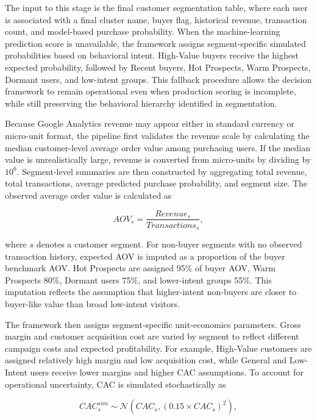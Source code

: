 \documentclass[conference]{IEEEtran}
\begin{document}
The input to this stage is the final customer segmentation table, where each user is associated with a final cluster name, buyer flag, historical revenue, transaction count, and model-based purchase probability. When the machine-learning prediction score is unavailable, the framework assigns segment-specific simulated probabilities based on behavioral intent. High-Value buyers receive the highest expected probability, followed by Recent buyers, Hot Prospects, Warm Prospects, Dormant users, and low-intent groups. This fallback procedure allows the decision framework to remain operational even when production scoring is incomplete, while still preserving the behavioral hierarchy identified in segmentation.

Because Google Analytics revenue may appear either in standard currency or micro-unit format, the pipeline first validates the revenue scale by calculating the median customer-level average order value among purchasing users. If the median value is unrealistically large, revenue is converted from micro-units by dividing by $10^{6}$. Segment-level summaries are then constructed by aggregating total revenue, total transactions, average predicted purchase probability, and segment size. The observed average order value is calculated as

\begin{equation}
AOV_s = \frac{\textit{Revenue}_s}{\textit{Transactions}_s},
\end{equation}

where $s$ denotes a customer segment. For non-buyer segments with no observed transaction history, expected AOV is imputed as a proportion of the buyer benchmark AOV. Hot Prospects are assigned 95\% of buyer AOV, Warm Prospects 80\%, Dormant users 75\%, and lower-intent groups 55\%. This imputation reflects the assumption that higher-intent non-buyers are closer to buyer-like value than broad low-intent visitors.

The framework then assigns segment-specific unit-economics parameters. Gross margin and customer acquisition cost are varied by segment to reflect different campaign costs and expected profitability. For example, High-Value customers are assigned relatively high margin and low acquisition cost, while General and Low-Intent users receive lower margins and higher CAC assumptions. To account for operational uncertainty, CAC is simulated stochastically as

\begin{equation}
CAC_s^{sim} \sim \mathcal{N}(CAC_s, (0.15 \times CAC_s)^2),
\end{equation}
\end{document}
